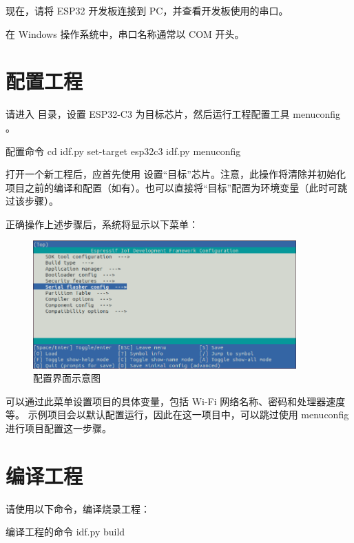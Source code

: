\documentclass[lang=cn,newtx,10pt,scheme=chinese]{elegantbook}
\begin{document}
现在，请将 ESP32 开发板连接到 PC，并查看开发板使用的串口。

在 Windows 操作系统中，串口名称通常以 COM 开头。

\section{配置工程}

请进入  目录，设置 ESP32-C3 为目标芯片，然后运行工程配置工具 menuconfig 。

\begin{mycode}{配置命令}
cd %
idf.py set-target esp32c3
idf.py menuconfig
\end{mycode}

打开一个新工程后，应首先使用  设置“目标”芯片。注意，此操作将清除并初始化项目之前的编译和配置（如有）。也可以直接将“目标”配置为环境变量（此时可跳过该步骤）。

正确操作上述步骤后，系统将显示以下菜单：

\begin{figure}[!htb]
\centering
\includegraphics[width=0.9\textwidth]{project-configuration.png}
\caption{配置界面示意图}
\end{figure}

可以通过此菜单设置项目的具体变量，包括 Wi-Fi 网络名称、密码和处理器速度等。 示例项目会以默认配置运行，因此在这一项目中，可以跳过使用 menuconfig 进行项目配置这一步骤。

\section{编译工程}

请使用以下命令，编译烧录工程：

\begin{mycode}{编译工程的命令}
idf.py build
\end{mycode}
\end{document}
